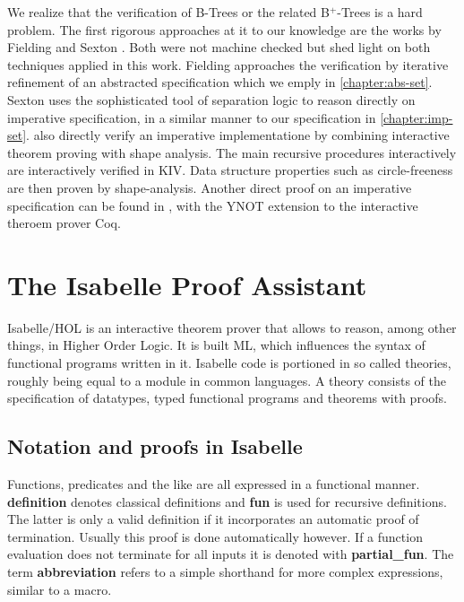 We realize that the verification of B-Trees or the related B$^+$-Trees
is a hard problem.
The first rigorous approaches at it to our knowledge are the works by Fielding \parencite{Fielding80}
and Sexton \parencite{DBLP:journals/entcs/SextonT08}.
Both were not machine checked but shed light on both techniques applied in this work.
Fielding approaches the verification by iterative refinement of an abstracted
specification which we emply in \autoref{chapter:abs-set}.
Sexton uses the sophisticated tool of separation logic to reason directly 
on imperative specification, in a similar manner to our specification in \autoref{chapter:imp-set}.
\parencite{DBLP:journals/sosym/ErnstSR15} also directly verify an imperative
implementatione by combining interactive theorem proving 
with shape analysis.
The main recursive procedures interactively are interactively verified in KIV.
Data structure properties such as circle-freeness are then proven by shape-analysis.
Another direct proof on an imperative specification 
can be found in \parencite{DBLP:conf/popl/MalechaMSW10}, with the YNOT
extension to the interactive theroem prover Coq.


\section{The Isabelle Proof Assistant}

Isabelle/HOL is an interactive theorem prover that allows
to reason, among other things, in Higher Order Logic.\parencite{DBLP:books/sp/NipkowPW02}
It is built ML, which influences the syntax of functional
programs written in it.
Isabelle code is portioned in so called theories,
roughly being equal to a module in common languages.
A theory consists of the specification of datatypes,
typed functional programs and theorems with proofs.

\subsection{Notation and proofs in Isabelle}

Functions, predicates and the like are all expressed in
a functional manner.
\textbf{definition} denotes classical definitions and \textbf{fun}
is used for recursive definitions.
The latter is only a valid definition if it incorporates an automatic proof of termination.
Usually this proof is done automatically however.
If a function evaluation does not terminate for all inputs
it is denoted with \textbf{partial\_fun}.
The term \textbf{abbreviation} refers to a simple shorthand for more complex expressions,
similar to a macro.

